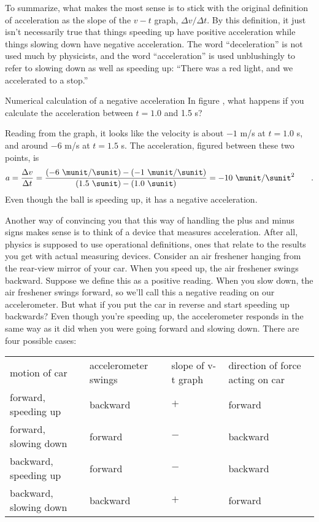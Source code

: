 To summarize, what makes the most sense is to stick with the
original definition of acceleration as the slope of the
$v-t$ graph, $\Delta v/\Delta t$. By this definition, it
just isn't necessarily true that things speeding up have
positive acceleration while things slowing down have
negative acceleration. The word ``deceleration'' is not used
much by physicists, and the word ``acceleration'' is used
unblushingly to refer to slowing down as well as speeding
up: ``There was a red light, and we accelerated to a stop.''

\begin{eg}{Numerical calculation of a negative acceleration}
\egquestion In figure , what happens if you
calculate the acceleration between $t=1.0$ and 1.5 s?

\eganswer Reading from the graph, it looks like the velocity
is about $-1$ m/s at $t=1.0$ s, and around $-6$ m/s at $t=1.5$ s.
The acceleration, figured between these two points, is
\begin{equation*}
  a = \frac{\Delta v}{\Delta t} = \frac{(-6\ \munit/\sunit)-(-1\ \munit/\sunit)}{(1.5\ \sunit)-(1.0\ \sunit)} = -10\ \munit/\sunit^2  \qquad   .
\end{equation*}
Even though the ball is speeding up, it has a negative acceleration.
\end{eg}

Another way of convincing you that this way of handling the
plus and minus signs makes sense is to think of a device
that measures acceleration. After all, physics is supposed
to use operational definitions, ones that relate to the
results you get with actual measuring devices.
Consider an
air freshener hanging from the rear-view mirror of your car.
When you speed up, the air freshener swings backward.
Suppose we define this as a positive reading. When you slow
down, the air freshener swings forward, so we'll call this a
negative reading on our accelerometer. But what if you put
the car in reverse and start speeding up backwards? Even
though you're speeding up, the accelerometer responds in the
same way as it did when you were going forward and slowing
down. There are four possible cases:

\noindent\begin{tabular}{p{40mm}p{21mm}p{16mm}p{17mm}}
motion of car & accelerometer swings & slope of v-t graph & direction of force acting on car \\
forward, speeding up      & backward   & $+$   & forward \\
forward, slowing down     & forward    & $-$   & backward \\
backward, speeding up     & forward    & $-$   & backward \\
backward, slowing down    & backward   & $+$   & forward \\
\end{tabular}

